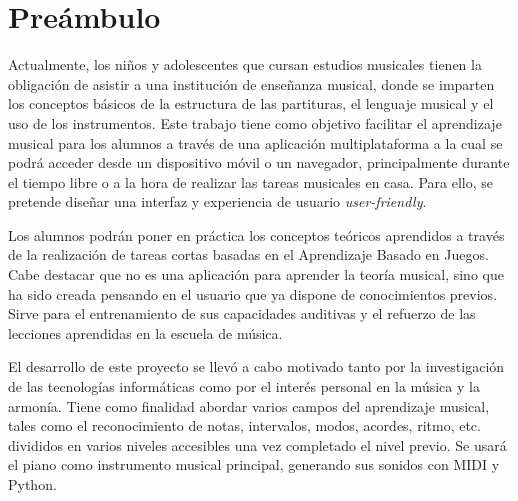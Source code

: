 
\chapter*{Preámbulo}
\thispagestyle{empty}
\par Actualmente, los niños y adolescentes que cursan estudios musicales tienen la obligación de asistir a una institución de enseñanza musical, donde se imparten los conceptos básicos de la estructura de las partituras, el lenguaje musical y el uso de los instrumentos. Este trabajo tiene como objetivo facilitar el aprendizaje musical para los alumnos a través de una aplicación multiplataforma a la cual se podrá acceder desde un dispositivo móvil o un navegador, principalmente durante el tiempo libre o a la hora de realizar las tareas musicales en casa. Para ello, se pretende diseñar una interfaz y experiencia de usuario \textit{user-friendly}. 
\par Los alumnos podrán poner en práctica los conceptos teóricos aprendidos a través de la realización de tareas cortas basadas en el Aprendizaje Basado en Juegos. Cabe destacar que no es una aplicación para aprender la teoría musical, sino que ha sido creada pensando en el usuario que ya dispone de conocimientos previos. Sirve para el entrenamiento de sus capacidades auditivas y el refuerzo de las lecciones aprendidas en la escuela de música.

\par El desarrollo de este proyecto se llevó a cabo motivado tanto por la investigación de las tecnologías informáticas como por el interés personal en la música y la armonía. Tiene como finalidad abordar varios campos del aprendizaje musical, tales como el reconocimiento de notas, intervalos, modos, acordes, ritmo, etc. divididos en varios niveles accesibles una vez completado el nivel previo. Se usará el piano como instrumento musical principal, generando sus sonidos con MIDI y Python.

